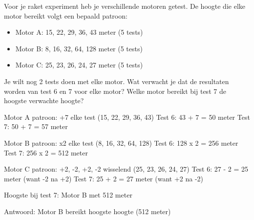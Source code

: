 \begin{opgave}
Voor je raket experiment heb je verschillende motoren getest. De hoogte die
elke motor bereikt volgt een bepaald patroon:

\begin{itemize}
\item Motor A: 15, 22, 29, 36, 43 meter (5 tests)
\item Motor B: 8, 16, 32, 64, 128 meter (5 tests)
\item Motor C: 25, 23, 26, 24, 27 meter (5 tests)
\end{itemize}

Je wilt nog 2 tests doen met elke motor. Wat verwacht je dat de resultaten
worden van test 6 en 7 voor elke motor? Welke motor bereikt bij test 7 de
hoogste verwachte hoogte?
\end{opgave}

\begin{oplossing}
Motor A patroon: +7 elke test (15, 22, 29, 36, 43)
Test 6: 43 + 7 = 50 meter
Test 7: 50 + 7 = 57 meter

Motor B patroon: x2 elke test (8, 16, 32, 64, 128)
Test 6: 128 x 2 = 256 meter
Test 7: 256 x 2 = 512 meter

Motor C patroon: +2, -2, +2, -2 wisselend (25, 23, 26, 24, 27)
Test 6: 27 - 2 = 25 meter (want -2 na +2)
Test 7: 25 + 2 = 27 meter (want +2 na -2)

Hoogste bij test 7: Motor B met 512 meter

Antwoord: Motor B bereikt hoogste hoogte (512 meter)
\end{oplossing}